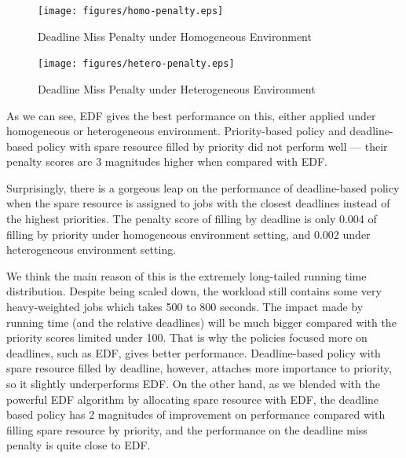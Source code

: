 \begin{figure}[htbp]
  \centering
  \texttt{[image: figures/homo-penalty.eps]}
  \caption{Deadline Miss Penalty under Homogeneous Environment}
  \label{fig:homo-penalty}
\end{figure}

\begin{figure}[htbp]
  \centering
  \texttt{[image: figures/hetero-penalty.eps]}
  \caption{Deadline Miss Penalty under Heterogeneous Environment}
  \label{fig:hetero-penalty}
\end{figure}

As we can see, EDF gives the best performance on this, either applied
under homogeneous or heterogeneous environment.
Priority-based policy and deadline-based policy with spare resource
filled by priority did not perform well --- their penalty scores are 3
magnitudes higher when compared with EDF.

Surprisingly, there is a gorgeous leap on the performance of
deadline-based policy when the spare resource is assigned to jobs with
the closest deadlines instead of the highest priorities.
The penalty score of filling by deadline is only 0.004 of filling by
priority under homogeneous environment setting, and 0.002 under
heterogeneous environment setting.

We think the main reason of this is the extremely long-tailed running
time distribution.
Despite being scaled down, the workload still contains some very
heavy-weighted jobs which takes 500 to 800 seconds.
The impact made by running time (and the relative deadlines) will be
much bigger compared with the priority scores limited under 100.
That is why the policies focused more on deadlines, such as EDF, gives
better performance.
Deadline-based policy with spare resource filled by deadline, however,
attaches more importance to priority, so it slightly underperforms EDF.
On the other hand, as we blended with the powerful EDF algorithm by
allocating spare resource with EDF, the deadline based policy has 2
magnitudes of improvement on performance compared with filling spare
resource by priority, and the performance on the deadline miss penalty
is quite close to EDF.

